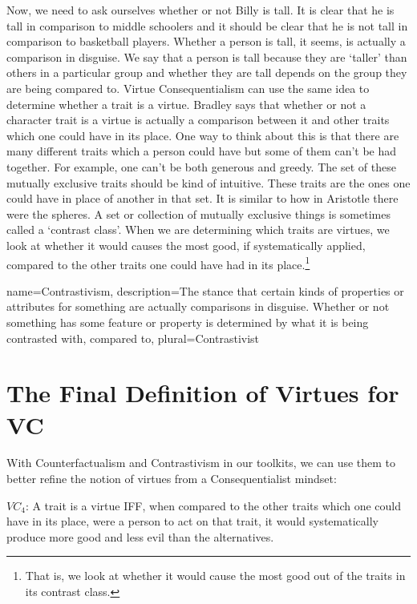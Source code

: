 Now, we need to ask ourselves whether or not Billy is tall. It is clear that he is tall in comparison to middle schoolers and it should be clear that he is not tall in comparison to basketball players. Whether a person is tall, it seems, is actually a comparison in disguise. We say that a person is tall because they are `taller' than others in a particular group and whether they are tall depends on the group they are being compared to. Virtue Consequentialism can use the same idea to determine whether a trait is a virtue. Bradley says that whether or not a character trait is a virtue is actually a comparison between it and other traits which one could have in its place. One way to think about this is that there are many different traits which a person could have but some of them can’t be had together. For example, one can’t be both generous and greedy. The set of these mutually exclusive traits should be kind of intuitive. These traits are the ones one could have in place of another in that set. It is similar to how in Aristotle there were the spheres. A set or collection of mutually exclusive things is sometimes called a `contrast class'. When we are determining which traits are virtues, we look at whether it would causes the most good, if systematically applied, compared to the other traits one could have had in its place.\footnote{That is, we look at whether it would cause the most good out of the traits in its contrast class.}  

{
  name=Contrastivism,
  description={The stance that certain kinds of properties or attributes for something are actually comparisons in disguise. Whether or not something has some feature or property is determined by what it is being contrasted with, compared to},
  plural=Contrastivist
}


\section{The Final Definition of Virtues for VC}

With Counterfactualism and Contrastivism in our toolkits, we can use them to better refine the notion of virtues from a Consequentialist mindset:

\begin{center}
$VC_4$: A trait is a virtue IFF, when compared to the other traits which one could have in its place, were a person to act on that trait, it would systematically produce more good and less evil than the alternatives. 
\end{center}

